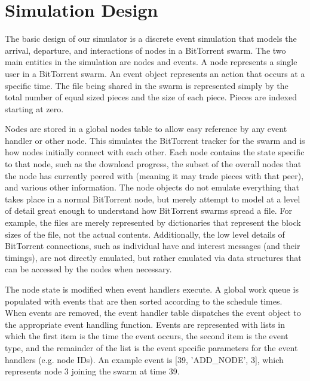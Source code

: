 \section{Simulation Design}

The basic design of our simulator is a discrete event simulation
that models the arrival, departure, and interactions of nodes in a
BitTorrent swarm. The two main entities in the simulation are nodes
and events. A node represents a single user in a BitTorrent swarm.
An event object represents an action that occurs at a specific time.
The file being shared in the swarm is represented simply by the total
number of equal sized pieces and the size of each piece. Pieces are
indexed starting at zero.

Nodes are stored in a global nodes table to allow easy reference by
any event handler or other node. This simulates the BitTorrent tracker
for the swarm and is how nodes initially connect with each other. Each
node contains the state specific to that node, such as the download
progress, the subset of the overall nodes that the node has currently
peered with (meaning it may trade pieces with that peer), and various
other information. The node objects do not emulate everything that takes
place in a normal BitTorrent node, but merely attempt to model at a
level of detail great enough to understand how BitTorrent swarms spread
a file. For example, the files are merely represented by dictionaries
that represent the block sizes of the file, not the actual contents.
Additionally, the low level details of BitTorrent connections, such
as individual have and interest messages (and their timings), are not
directly emulated, but rather emulated via data structures that can be
accessed by the nodes when necessary.

The node state is modified when event handlers execute.
A global work queue is populated with events that are
then sorted according to the schedule times. When events are removed,
the event handler table dispatches the event object to the appropriate
event handling function. Events are represented with lists in which the first
item is the time the event occurs, the second item is the event type, and the remainder
of the list is the event specific parameters for the event handlers (e.g. node IDs).
An example event is [39, 'ADD\_NODE', 3], which represents node 3 joining the swarm at
time 39.

